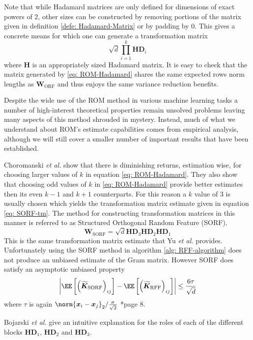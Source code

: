 Note that while Hadamard matrices are only defined for dimensions of exact powers of 2, other sizes can be constructed by removing portions of the matrix given in definition \ref{defe: Hadamard-Matrix} or by padding by $0$. This gives a concrete means for which one can generate a transformation matrix
\begin{equation} \label{eq: ROM-Hadamard}
    \sqrt{d} \prod_{i=1}^{k} \bm{H} \bm{D}_{i}
\end{equation}
where $\bm{H}$ is an appropriately sized Hadamard matrix. It is easy to check that the matrix generated by \ref{eq: ROM-Hadamard} shares the same expected rows norm lengths as $\bm{W}_{\text{ORF}}$ and thus enjoys the same variance reduction benefits.

Despite the wide use of the ROM method in various machine learning tasks \cite{ChoromanskiKrzysztof2017TUEo,AndoniAlexandr2015PaOL,ChoromanskiKrzysztof2020RAwP} a number of high-interest theoretical properties remain unsolved problems leaving many aspects of this method shrouded in mystery. Instead, much of what we understand about ROM's estimate capabilities comes from empirical analysis, although we will still cover a smaller number of important results that have been established.

Choromanski {\it et al.} \cite{ChoromanskiKrzysztof2017TUEo} show that there is diminishing returns, estimation wise, for choosing larger values of $k$ in equation \ref{eq: ROM-Hadamard}. They also show that choosing odd values of $k$ in \ref{eq: ROM-Hadamard} provide better estimates then its even $k-1$ and $k+1$ counterparts. For this reason a $k$ value of $3$ is usually chosen which yields the transformation matrix estimate given in equation \ref{eq: SORF-tm}. The method for constructing transformation matrices in this manner is referred to as Structured Orthogonal Random Feature (SORF).
\begin{equation} \label{eq: SORF-tm}
    \bm{W}_{\text{SORF}} = \sqrt{d} \bm{H} \bm{D}_{3} \bm{H} \bm{D}_{2} \bm{H} \bm{D}_{1}
\end{equation}
This is the same transformation matrix estimate that Yu {\it et al.} provides. Unfortunately using the SORF method in algorithm \ref{alg: RFF-algorithm} does not produce an unbiased estimate of the Gram matrix. However SORF does satisfy an asymptotic unbiased property
\begin{equation*}
    \left| \EE \left[ \left( \bm{\widetilde{K}}_{\text{SORF}} \right)_{ij} \right] - \EE \left[ \left( \bm{\widetilde{K}}_{\text{RFF}} \right)_{ij} \right] \right| \leq \frac{6 \tau}{\sqrt{d}}
\end{equation*}
where $\tau$ is again $\norm{\bm{x}_i - \bm{x}_j}_2 / \frac{\sigma}{\sqrt{2}}$ \cite{LiuFanghui2021RFfK}*{page 8}.

Bojarski {\it et al.} \cite{BojarskiMariusz2016Saar} give an intuitive explanation for the roles of each of the different blocks $\bm{H} \bm{D}_1$, $\bm{H} \bm{D}_2$ and $\bm{H} \bm{D}_3$.